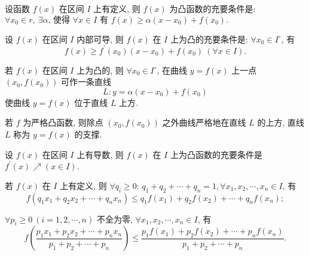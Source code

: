 \begin{theorem}
    设函数 $ f(x) $ 在区间 $ I $ 上有定义, 则 $ f(x) $ 为凸函数的充要条件是: $ \forall x_{0} \in   r,~
        \exists  \alpha \text{, 使得 } \forall x \in I  \text{ 有 }  f(x) \geqslant \alpha\left(x-x_{0}\right)+f\left(x_{0}\right) .$
\end{theorem}

\begin{inference}
    设 $ f(x) $ 在区间 $ I $ 内部可导, 则 $ f(x) $ 在 $ I $ 上为凸的充要条件是: $ \forall x_{0} \in I^{\circ}$, 有
    $$f(x) \geqslant f^{\prime}\left(x_{0}\right)\left(x-x_{0}\right)+f\left(x_{0}\right)~ (\forall x \in I) .$$
\end{inference}

\begin{inference}
    若 $ f(x) $ 在区间 $ I $ 上为凸的, 则 $ \forall x_{0} \in I^{\circ}$, 在曲线 $ y=f(x) $ 上一点 $ \left(x_{0}\right. ,  \left.f\left(x_{0}\right)\right)$ 可作一条直线
    $$L: y=\alpha\left(x-x_{0}\right)+f\left(x_{0}\right)$$
    使曲线 $ y=f(x) $ 位于直线 $ L $ 上方.
\end{inference}

\begin{theorem}[分离性定理]
    若 $ f $ 为严格凸函数, 则除点 $ \left(x_{0}, f\left(x_{0}\right)\right) $ 之外曲线严格地在直线 $ L $ 的上方, 直线 $ L $ 称为 $ y=f(x) $ 的支撑.
\end{theorem}

\begin{theorem}
    设 $ f(x) $ 在区间 $ I $ 上有导数, 则 $ f(x) $ 在 $ I $ 上为凸函数的充要条件是 $ f^{\prime}(x) \nearrow(x \in I) .$
\end{theorem}

\begin{theorem}
    若 $f(x)$ 在 $I$ 上有定义, 则
    $\forall q_{i} \geqslant 0$: $q_{1}+q_{2}+\cdots+q_{n}=1, \forall x_{1}, x_{2}, \cdots, x_{n} \in I$, 有
    $$f\left(q_{1} x_{1}+q_{2} x_{2}+\cdots+q_{n} x_{n}\right) \leqslant q_{1} f\left(x_{1}\right)+q_{2} f\left(x_{2}\right)+\cdots+q_{n} f\left(x_{n}\right);$$

    $\forall p_{i} \geqslant 0~ (i=1,2, \cdots, n)$ 不全为零, $\forall x_{1}, x_{2}, \cdots, x_{n} \in I$, 有
    $$f\left(\frac{p_{1} x_{1}+p_{2} x_{2}+\cdots+p_{n} x_{n}}{p_{1}+p_{2}+\cdots+p_{n}}\right) \leqslant \frac{p_{1} f\left(x_{1}\right)+p_{2} f\left(x_{2}\right)+\cdots+p_{n} f\left(x_{n}\right)}{p_{1}+p_{2}+\cdots+p_{n}} .$$
\end{theorem}

